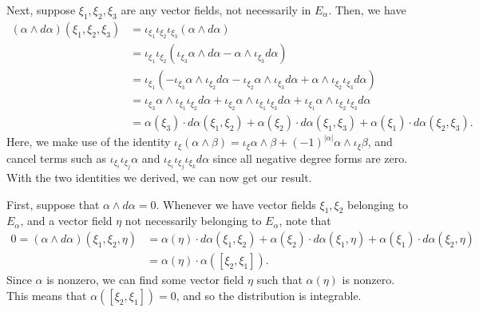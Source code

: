 \documentclass{../../templates/lkx_pset}
\begin{document}
\begin{parts}
\[	\]
	Next, suppose $\xi_1,\xi_2,\xi_3$ are any vector fields, not necessarily in $E_\alpha$. Then, we have
	\[
		\begin{aligned}
			(\alpha\wedge d\alpha)(\xi_1, \xi_2, \xi_3)
			 & =\iota_{\xi_1}\iota_{\xi_2}\iota_{\xi_3} (\alpha\wedge d\alpha)                                                                                                                           \\
			 & =\iota_{\xi_1}\iota_{\xi_2} ( \iota_{\xi_3} \alpha\wedge d\alpha - \alpha\wedge \iota_{\xi_3} d\alpha)                                                                                    \\
			 & = \iota_{\xi_1}(-\iota_{\xi_3}\alpha \wedge \iota_{\xi_2}d\alpha - \iota_{\xi_2}\alpha\wedge \iota_{\xi_3} d\alpha + \alpha\wedge \iota_{\xi_2}\iota_{\xi_3}d\alpha)                      \\
			 & =\iota_{\xi_3}\alpha\wedge \iota_{\xi_1}\iota_{\xi_2} d\alpha + \iota_{\xi_2}\alpha\wedge \iota_{\xi_1}\iota_{\xi_3}d\alpha + \iota_{\xi_1}\alpha\wedge \iota_{\xi_2}\iota_{\xi_3}d\alpha \\
			 & = \alpha(\xi_3)\cdot d\alpha(\xi_1, \xi_2) + \alpha(\xi_2)\cdot d\alpha(\xi_1, \xi_3) + \alpha(\xi_1)\cdot d\alpha(\xi_2, \xi_3).
		\end{aligned}
	\]
	Here, we make use of the identity $\iota_{\xi}(\alpha\wedge \beta) = \iota_{\xi}\alpha\wedge \beta + (-1)^{|\alpha|}\alpha\wedge \iota_{\xi}\beta$, and cancel terms such as $\iota_{\xi_i}\iota_{\xi_j} \alpha$ and $\iota_{\xi_i}\iota_{\xi_j}\iota_{\xi_k}d\alpha$ since all negative degree forms are zero. With the two identities we derived, we can now get our result.

	First, suppose that $\alpha\wedge d\alpha=0$. Whenever we have vector fields $\xi_1, \xi_2$ belonging to $E_\alpha$, and a vector field $\eta$ not necessarily belonging to $E_\alpha$, note that
	\[
		\begin{aligned}
			0 = (\alpha\wedge d\alpha)(\xi_1, \xi_2, \eta)
			 & = \alpha(\eta)\cdot d\alpha(\xi_1, \xi_2) + \alpha(\xi_2)\cdot d\alpha(\xi_1, \eta) + \alpha(\xi_1)\cdot d\alpha(\xi_2, \eta) \\
			 & = \alpha(\eta)\cdot \alpha([\xi_2, \xi_1]).
		\end{aligned}
	\]
	Since $\alpha$ is nonzero, we can find some vector field $\eta$ such that $\alpha(\eta)$ is nonzero. This means that $\alpha([\xi_2,\xi_1])=0$, and so the distribution is integrable.


\end{parts}
\end{document}
